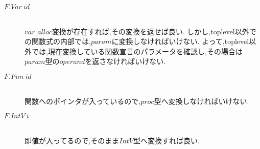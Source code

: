 \begin{description}

\item[$F.Var\ id$] \hfill \\
$var\_alloc$変換が存在すれば,その変換を返せば良い.
しかし,toplevel以外での関数式の内部では,$param$に変換しなければいけない.
よって,toplevel以外では,現在変換している関数宣言のパラメータを確認し,その場合は$param$型の$operand$を返さなければいけない.

\item[$F.Fun\ id$] \hfill \\
関数へのポインタが入っているので,$proc$型へ変換しなければいけない.

\item[$F.IntV\ i$] \hfill \\
即値が入ってるので,そのまま$IntV$型へ変換すれば良い.

\end{description}

